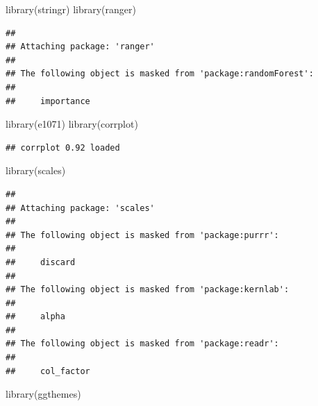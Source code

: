 \documentclass[
]{article}
\newenvironment{Shaded}{\begin{snugshade}}{\end{snugshade}}
\newcommand{\FunctionTok}[1]{\textcolor[rgb]{0.00,0.00,0.00}{#1}}
\newcommand{\NormalTok}[1]{#1}
\newcommand{\StringTok}[1]{\textcolor[rgb]{0.31,0.60,0.02}{#1}}
\begin{document}
\begin{Shaded}
\begin{Highlighting}[]
\FunctionTok{library}\NormalTok{(}\StringTok{\textquotesingle{}stringr\textquotesingle{}}\NormalTok{)}
\FunctionTok{library}\NormalTok{(}\StringTok{\textquotesingle{}ranger\textquotesingle{}}\NormalTok{)}
\end{Highlighting}
\end{Shaded}

\begin{verbatim}
## 
## Attaching package: 'ranger'
## 
## The following object is masked from 'package:randomForest':
## 
##     importance
\end{verbatim}

\begin{Shaded}
\begin{Highlighting}[]
\FunctionTok{library}\NormalTok{(}\StringTok{\textquotesingle{}e1071\textquotesingle{}}\NormalTok{)}
\FunctionTok{library}\NormalTok{(}\StringTok{\textquotesingle{}corrplot\textquotesingle{}}\NormalTok{)}
\end{Highlighting}
\end{Shaded}

\begin{verbatim}
## corrplot 0.92 loaded
\end{verbatim}

\begin{Shaded}
\begin{Highlighting}[]
\FunctionTok{library}\NormalTok{(}\StringTok{\textquotesingle{}scales\textquotesingle{}}\NormalTok{)}
\end{Highlighting}
\end{Shaded}

\begin{verbatim}
## 
## Attaching package: 'scales'
## 
## The following object is masked from 'package:purrr':
## 
##     discard
## 
## The following object is masked from 'package:kernlab':
## 
##     alpha
## 
## The following object is masked from 'package:readr':
## 
##     col_factor
\end{verbatim}

\begin{Shaded}
\begin{Highlighting}[]
\FunctionTok{library}\NormalTok{(}\StringTok{\textquotesingle{}ggthemes\textquotesingle{}}\NormalTok{)}
\end{Highlighting}
\end{Shaded}
\end{document}
